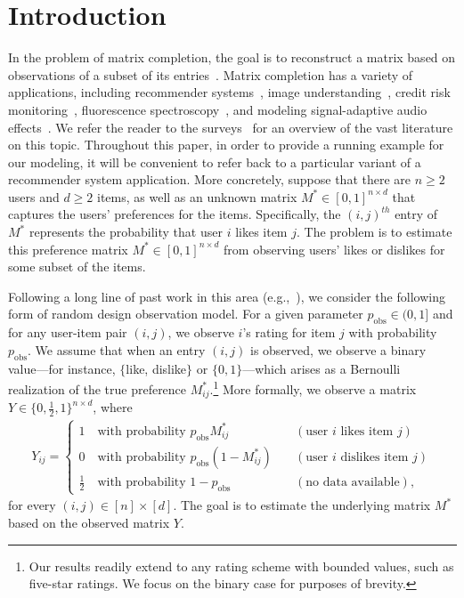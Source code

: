 \documentclass[11pt, hidelinks]{article} %
\newcommand{\half}{\ensuremath{{\frac{1}{2}}}}
\newcommand{\numrows}{n}
\newcommand{\numcols}{d}
\newcommand{\wtmatrix}{M}
\newcommand{\wtstar}{\wtmatrix^*}
\newcommand{\pp}{\ensuremath{p_{\mathrm{obs}}}}
\newcommand{\obs}{\ensuremath{Y}}
\begin{document}

\section{Introduction}

In the problem of matrix completion, the goal is to reconstruct a
matrix based on observations of a subset of its entries~\cite{Lau01}.
Matrix completion has a variety of applications, including recommender
systems~\cite{koren2009matrix}, image
understanding~\cite{lee1999learning}, credit risk
monitoring~\cite{vandendorpe2008parameterization}, fluorescence
spectroscopy~\cite{gobinet2004application}, and modeling
signal-adaptive audio effects~\cite{sarver2011application}. We refer
the reader to the surveys~\cite{gillis2014and,davenport2016overview}
for an overview of the vast literature on this topic.  Throughout this
paper, in order to provide a running example for our modeling, it will
be convenient to refer back to a particular variant of a recommender
system application.  More concretely, suppose that there are $\numrows
\geq 2$ users and $\numcols \geq 2$ items, as well as an unknown
matrix $\wtstar \in [0,1]^{\numrows \times \numcols}$ that captures
the users' preferences for the items. Specifically, the $(i,j)^{th}$
entry of $\wtstar$ represents the probability that user $i$ likes item
$j$. The problem is to estimate this preference matrix $\wtstar \in
[0,1]^{\numrows \times \numcols}$ from observing users' likes or
dislikes for some subset of the items.

Following a long line of past work in this area
(e.g.,~\cite{chen13,gross11,srebro2005generalization,
  candes09exact,candes10power, keshavan2010matrix, recht2011simpler,
  chatterjee2014matrix}), we consider the following form of random
design observation model.  For a given parameter $\pp
\in (0,1]$ and for any user-item pair $(i,j)$, we observe $i$'s rating
  for item $j$ with probability $\pp$. We assume that when an entry
  $(i,j)$ is observed, we observe a binary value---for instance,
  $\{$like, dislike$\}$ or $\{0,1\}$---which arises as a Bernoulli
  realization of the true preference $\wtstar_{ij}$.\footnote{Our
    results readily extend to any rating scheme with bounded values,
    such as five-star ratings. We focus on the binary case for
    purposes of brevity.}  More formally, we observe a matrix $\obs
  \in \{0,\half,1\}^{\numrows \times \numcols}$, where
\begin{align}
\label{EqnDefnObsLowrank}
\obs_{ij} =
\begin{cases}
1 \quad \mbox{with probability } \pp \wtstar_{ij} & \quad (\mbox{user
  $i$ likes item $j$}) \\
%
0 \quad \mbox{with probability } \pp (1-\wtstar_{ij}) & \quad
(\mbox{user $i$ dislikes item $j$})\\
%
\half \quad \mbox{with probability } 1 - \pp & \quad (\mbox{no data
  available}),
\end{cases}
\end{align}
for every $(i,j) \in [\numrows] \times [\numcols]$. The goal is to
estimate the underlying matrix $\wtstar$ based on the observed matrix
$\obs$.
\end{document}
